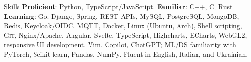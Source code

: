 

\begin{rubric}{Skills}
	\small{\textbf{Proficient}: Python, TypeScript/JavaScript. \textbf{Familiar}: C++, C, Rust. \textbf{Learning}: Go.}
	\small {Django, Spring, REST APIs, MySQL, PostgreSQL, MongoDB, Redis, Keycloak/OIDC.}
%
	\small{MQTT, Docker, Linux (Ubuntu, Arch), Shell scripting, \textsc{Git}, Nginx/Apache.}
%
	\small{Angular, Svelte, TypeScript, Highcharts, ECharts, WebGL2, responsive UI development.}
%
	\small{Vim, Copilot, ChatGPT; ML/DS familiarity with PyTorch, Scikit-learn, Pandas, NumPy.}
%
	\small {Fluent in English, Italian, and Ukrainian.}
\end{rubric}
